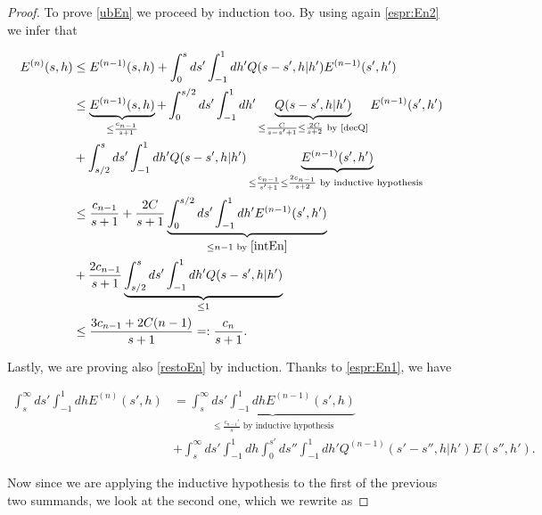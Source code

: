 \documentclass[a4paper,10pt,reqno]{amsart}
\numberwithin{equation}{subsection}
\numberwithin{figure}{subsection}
\begin{document}
\begin{proof}
To prove \eqref{ubEn} we proceed by induction too. By using again \eqref{espr:En2} we infer that

\begin{align*}
E^{(n)}(s,h)&\leq E^{(n-1)}(s,h)+\int_0^sds'\int_{-1}^1dh'Q(s-s',h|h')E^{(n-1)}(s',h')
\\
&\leq\underbrace{E^{(n-1)}(s,h)}_{\leq\frac{c_{n-1}}{s+1}}+\int_0^{s/2}ds'\int_{-1}^1dh'\underbrace{Q(s-s',h|h')}_{\leq\frac{C}{s-s'+1}\leq\frac{2C}{s+2}\textrm{ by \eqref{decQ}}}E^{(n-1)}(s',h')
\\
&+\int_{s/2}^sds'\int_{-1}^1dh'Q(s-s',h|h')\underbrace{E^{(n-1)}(s',h')}_{\leq\frac{c_{n-1}}{s'+1}\leq\frac{2c_{n-1}}{s+2}\textrm{ by inductive hypothesis }}
\\
&\leq\frac{c_{n-1}}{s+1}+\frac{2C}{s+1}\underbrace{\int_0^{s/2}ds'\int_{-1}^1dh'E^{(n-1)}(s',h')}_{\leq n-1\textrm{ by }\eqref{intEn}}
\\
&+\frac{2c_{n-1}}{s+1}\underbrace{\int_{s/2}^sds'\int_{-1}^1dh'Q(s-s',h|h')}_{\leq 1}
\\
&\leq\frac{3c_{n-1}+2C(n-1)}{s+1}=:\frac{c_n}{s+1}.
\end{align*}

Lastly, we are proving also \eqref{restoEn} by induction. Thanks to \eqref{espr:En1}, we have

{\small\begin{align*}
\int_s^{\infty}ds'\int_{-1}^1dhE^{(n)}(s',h)&=\underbrace{\int_s^{\infty}ds'\int_{-1}^1dhE^{(n-1)}(s',h)}_{\leq\frac{c_{n-1}'}{s}\textrm{ by inductive hypothesis}}
\\
&+\int_s^{\infty}ds'\int_{-1}^1dh\int_0^{s'}ds''\int_{-1}^1dh'Q^{(n-1)}(s'-s'',h|h')E(s'',h').
\end{align*}}

Now since we are applying the inductive hypothesis to the first of the previous two summands, we look at the second one, which we rewrite as


\end{proof}
\end{document}
